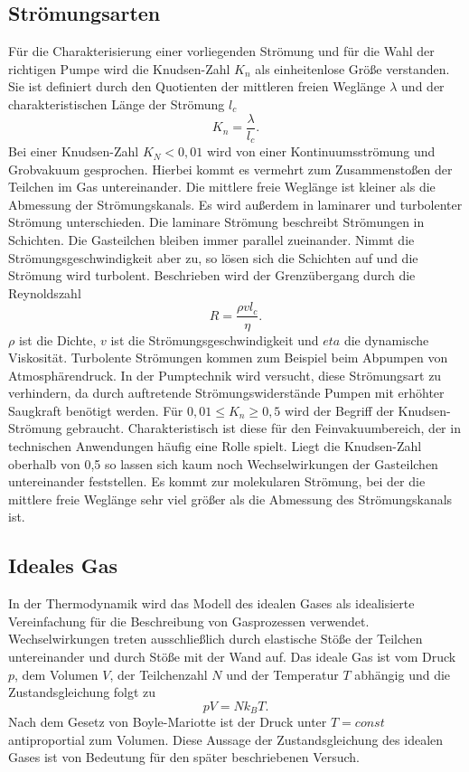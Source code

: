 \subsection{Strömungsarten}
Für die Charakterisierung einer vorliegenden Strömung und für die Wahl der richtigen Pumpe wird die Knudsen-Zahl $K_n$ als einheitenlose Größe verstanden.
Sie ist definiert durch den Quotienten der mittleren freien Weglänge $\lambda$ und der charakteristischen Länge der Strömung $l_c$
\begin{equation}
  K_n=\frac{\lambda}{l_c}.
\end{equation}
Bei einer Knudsen-Zahl $K_N < 0,01$ wird von einer Kontinuumsströmung und Grobvakuum gesprochen. Hierbei kommt es vermehrt zum Zusammenstoßen der Teilchen im Gas
untereinander. Die mittlere freie Weglänge ist kleiner als die Abmessung der Strömungskanals.
Es wird außerdem in laminarer und turbolenter Strömung unterschieden.
Die laminare Strömung beschreibt Strömungen in Schichten. Die Gasteilchen bleiben immer parallel zueinander.
Nimmt die Strömungsgeschwindigkeit aber zu, so lösen sich die Schichten auf und die Strömung wird turbolent.
Beschrieben wird der Grenzübergang durch die Reynoldszahl
\begin{equation}
  R=\frac{\rho v l_c}{\eta}.
\end{equation}
$\rho$ ist die Dichte, $v$ ist die Strömungsgeschwindigkeit und $eta$ die dynamische Viskosität.
Turbolente Strömungen kommen zum Beispiel beim Abpumpen von Atmosphärendruck.
In der Pumptechnik wird versucht, diese Strömungsart zu verhindern, da durch auftretende Strömungswiderstände Pumpen mit erhöhter Saugkraft benötigt werden.\newline
Für $ 0,01 \leq K_n \geq 0,5$ wird der Begriff der Knudsen-Strömung gebraucht.
Charakteristisch ist diese für den Feinvakuumbereich, der in technischen Anwendungen häufig eine Rolle spielt.\newline
Liegt die Knudsen-Zahl oberhalb von 0,5 so lassen sich kaum noch Wechselwirkungen der Gasteilchen untereinander feststellen.
Es kommt zur molekularen Strömung, bei der die mittlere freie Weglänge sehr viel größer als die Abmessung des Strömungskanals ist.
\subsection{Ideales Gas}
In der Thermodynamik wird das Modell des idealen Gases als idealisierte Vereinfachung für die Beschreibung von Gasprozessen verwendet.
Wechselwirkungen treten ausschließlich durch elastische Stöße der Teilchen untereinander und durch Stöße mit der Wand auf.
Das ideale Gas ist vom Druck $p$, dem Volumen $V$, der Teilchenzahl $N$ und der Temperatur $T$ abhängig und die Zustandsgleichung
folgt zu
\begin{equation}
pV=N k_B T.
\end{equation}
Nach dem Gesetz von Boyle-Mariotte ist der Druck unter $T=const$ antiproportial zum Volumen.
Diese Aussage der Zustandsgleichung des idealen Gases ist von Bedeutung für den später beschriebenen Versuch.
